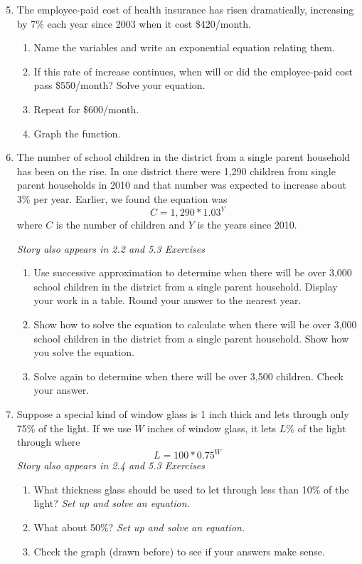 \begin{enumerate} 
\setcounter{enumi}{4}

\item The employee-paid cost of health insurance has risen dramatically, increasing by 7\% each year since 2003 when it cost \$420/month.  
\begin{enumerate}
\item Name the variables and write an exponential equation relating them.
\item If this rate of increase continues, when will or did the employee-paid cost pass \$550/month?  Solve your equation.
\item Repeat for \$600/month.
\item Graph the function.  
\end{enumerate}

\item The number of school children in the district from a single parent household has been on the rise.  In one district there were 1,290 children from single parent households in 2010 and that number was expected to increase about 3\% per year.  Earlier, we found the equation was $$C = 1,290\ast1.03^Y$$ where $C$ is the number of children and $Y$ is the years since 2010.

\hfill \emph{Story also appears in 2.2 and 5.3 Exercises}
\begin{enumerate}
\item Use successive approximation to determine when there will be over 3,000 school children in the district from a single parent household. Display your work in a table.  Round your answer to the nearest year.
\item Show how to solve the equation to calculate when there will be over 3,000 school children in the district from a single parent household. Show how you solve the equation.
\item Solve again to determine when there will be over 3,500 children. Check your answer.
\end{enumerate}

\item Suppose a special kind of window glass is 1 inch thick and lets through only 75\% of the light.  If we use $W$ inches of window glass, it lets $L\%$ of the light through where $$L = 100\ast 0.75^W$$
\hfill \emph{Story also appears in 2.4 and 5.3 Exercises}
\begin{enumerate}
\item What thickness glass should be used to let through less than 10\% of the light?  \emph{Set up and solve an equation.}
\item What about 50\%? \emph{Set up and solve an equation.}
\item Check the graph (drawn before) to see if your answers make sense.
\end{enumerate}


\end{enumerate}
